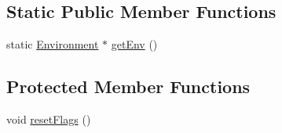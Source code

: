 \subsection*{Static Public Member Functions}
\begin{DoxyCompactItemize}
\item 
static \hyperlink{classEnvironment}{Environment} $\ast$ \hyperlink{classBaseObject_a3f3c53a54006151370013c39262682c6}{get\-Env} ()
\end{DoxyCompactItemize}
\subsection*{Protected Member Functions}
\begin{DoxyCompactItemize}
\item 
void \hyperlink{classBaseObject_ad202362d71b6e41b168e88592c5c5fc0}{reset\-Flags} ()
\end{DoxyCompactItemize}
